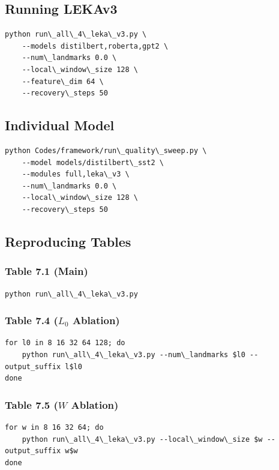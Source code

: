 \subsection{Running LEKAv3}

\begin{lstlisting}
python run\_all\_4\_leka\_v3.py \
    --models distilbert,roberta,gpt2 \
    --num\_landmarks 0.0 \
    --local\_window\_size 128 \
    --feature\_dim 64 \
    --recovery\_steps 50
\end{lstlisting}

\subsection{Individual Model}

\begin{lstlisting}
python Codes/framework/run\_quality\_sweep.py \
    --model models/distilbert\_sst2 \
    --modules full,leka\_v3 \
    --num\_landmarks 0.0 \
    --local\_window\_size 128 \
    --recovery\_steps 50
\end{lstlisting}

\subsection{Reproducing Tables}

\subsubsection{Table 7.1 (Main)}
\begin{lstlisting}
python run\_all\_4\_leka\_v3.py
\end{lstlisting}

\subsubsection{Table 7.4 ($L_0$ Ablation)}
\begin{lstlisting}
for l0 in 8 16 32 64 128; do
    python run\_all\_4\_leka\_v3.py --num\_landmarks $l0 --output_suffix l$l0
done
\end{lstlisting}

\subsubsection{Table 7.5 ($W$ Ablation)}
\begin{lstlisting}
for w in 8 16 32 64; do
    python run\_all\_4\_leka\_v3.py --local\_window\_size $w --output_suffix w$w
done
\end{lstlisting}

